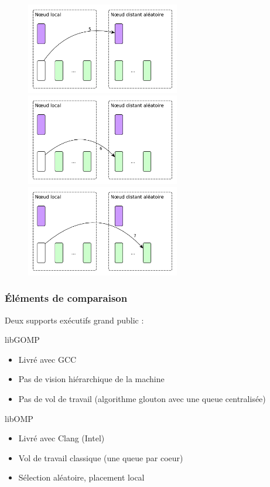 \documentclass[xcolor={usenames,dvipsnames,svgnames,table}, aspectratio=43]{beamer}
\begin{document}
\begin{frame}
\begin{figure}
{  }%
   {%
    \includegraphics[width=0.6\textwidth]{graph/steal_strategies_anim_5.pdf}%
  }%
   {%
    \includegraphics[width=0.6\textwidth]{graph/steal_strategies_anim_6.pdf}%
  }%
   {%
    \includegraphics[width=0.6\textwidth]{graph/steal_strategies_anim_7.pdf}%
  }%
\end{figure}

\end{frame}

\begin{frame}
\frametitle{Éléments de comparaison}

Deux supports exécutifs grand public :

\begin{block}{libGOMP}
  \begin{itemize}
    \item Livré avec GCC
    \item Pas de vision hiérarchique de la machine
    \item Pas de vol de travail (algorithme glouton avec une queue centralisée)
  \end{itemize}
\end{block}

\begin{block}{libOMP}
  \begin{itemize}
    \item Livré avec Clang (Intel)
    \item Vol de travail classique (une queue par coeur)
    \item Sélection aléatoire, placement local
  \end{itemize}
\end{block}

\end{frame}
\end{document}
